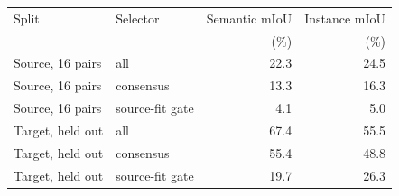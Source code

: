 \begin{tabular}{llrr}
\toprule
Split & Selector & Semantic mIoU & Instance mIoU \\
 & & (\%) & (\%) \\
\midrule
Source, 16 pairs & all & 22.3 & 24.5 \\
Source, 16 pairs & consensus & 13.3 & 16.3 \\
Source, 16 pairs & source-fit gate & 4.1 & 5.0 \\
Target, held out & all & 67.4 & 55.5 \\
Target, held out & consensus & 55.4 & 48.8 \\
Target, held out & source-fit gate & 19.7 & 26.3 \\
\bottomrule
\end{tabular}
